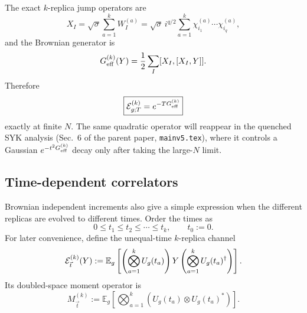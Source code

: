 \documentclass{article}
\theoremstyle{definition}
\begin{document}
The exact $k$-replica jump operators are
\begin{equation}
    X_I
    =\sqrt\sigma\sum_{a=1}^kW_I^{(a)}
    =\sqrt\sigma\,i^{q/2}
      \sum_{a=1}^k
      \chi_{i_1}^{(a)}\cdots\chi_{i_q}^{(a)},
\end{equation}
and the Brownian generator is
\begin{equation}
    G_{\rm eff}^{(k)}(Y)
    =\frac12\sum_I[X_I,[X_I,Y]].
\end{equation}
Therefore
\begin{equation}
    \boxed{
    {\cal E}_{g;T}^{(k)}=e^{-TG_{\rm eff}^{(k)}}
    }
\end{equation}
exactly at finite $N$.  The same quadratic operator will reappear in the
quenched SYK analysis (Sec.~6 of the parent paper, \texttt{mainv5.tex}), where it controls a
Gaussian $e^{-t^2G_{\rm eff}^{(k)}}$ decay only after taking the large-$N$
limit.

\subsection{Time-dependent correlators}
\label{subsec:brownian_syk_time_correlators}

Brownian independent increments also give a simple expression when the
different replicas are evolved to different times.  Order the times as
\begin{equation}
    0\leq t_1\leq t_2\leq\cdots\leq t_k,
    \qquad
    t_0:=0.
    \label{eq:brownian_ordered_times}
\end{equation}
For later convenience, define the unequal-time $k$-replica channel
\begin{equation}
    {\cal E}^{(k)}_{\vec t}(Y)
    :=
    \mathbb E_g
    \left[
       \left(
          \bigotimes_{a=1}^k U_g(t_a)
       \right)
       Y
       \left(
          \bigotimes_{a=1}^k U_g(t_a)^\dagger
       \right)
    \right].
    \label{eq:brownian_unequal_channel}
\end{equation}
Its doubled-space moment operator is
\begin{equation}
    M^{(k)}_{\vec t}
    :=
    \mathbb E_g
    \left[
       \bigotimes_{a=1}^k
       \left(
          U_g(t_a)\otimes U_g(t_a)^*
       \right)
    \right].
    \label{eq:brownian_unequal_moment}
\end{equation}
\end{document}
